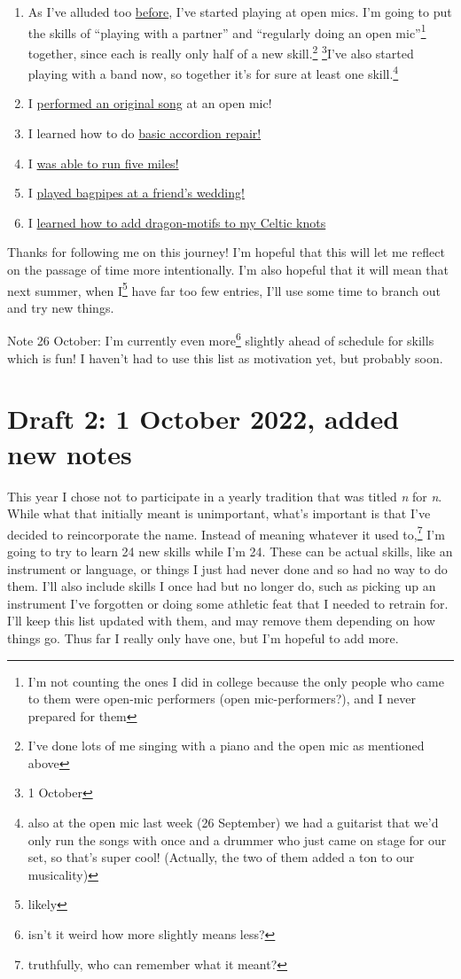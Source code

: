 \documentclass[12pt]{article}[titlepage]
\newcommand{\say}[1]{``#1''}
\newcommand{\1}{\={a}}
\newcommand{\2}{\={e}}
\newcommand{\3}{\={\i}}
\newcommand{\4}{\=o}
\newcommand{\5}{\=u}
\newcommand{\6}{\={A}}
\renewcommand{\,}{\textsuperscript{,}}
\begin{document}
\begin{enumerate}
\item As I've alluded too \href{open-mic-2.html}{before}, I've started playing at open mics.
I'm going to put the skills of \say{playing with a partner} and \say{regularly doing an open mic}\footnote{I'm not counting the ones I did in college because the only people who came to them were open-mic performers (open mic-performers?), and I never prepared for them} together, since each is really only half of a new skill.\footnote{I've done lots of me singing with a piano and the open mic as mentioned above} \footnote{1 October}I've also started playing with a band now, so together it's for sure at least one skill.\footnote{also at the open mic last week (26 September) we had a guitarist that we'd only run the songs with once and a drummer who just came on stage for our set, so that's super cool! (Actually, the two of them added a ton to our musicality)}
\item I \href{performing-a-song.html}{performed an original song} at an open mic!
\item I learned how to do \href{accordion-repair.html}{basic accordion repair!}
\item I \href{running-2.html}{was able to run five miles!} 
\item I \href{bagpipes.html}{played bagpipes at a friend's wedding!}
\item I \href{celtic-knots.html}{learned how to add dragon-motifs to my Celtic knots}
\end{enumerate}

Thanks for following me on this journey!
I'm hopeful that this will let me reflect on the passage of time more intentionally.
I'm also hopeful that it will mean that next summer, when I\footnote{likely} have far too few entries, I'll use some time to branch out and try new things.

Note 26 October: I'm currently even more\footnote{isn't it weird how more slightly means less?} slightly ahead of schedule for skills which is fun! 
I haven't had to use this list as motivation yet, but probably soon.


\section{Draft 2: 1 October 2022, added new notes}
This year I chose not to participate in a yearly tradition that was titled \textit{n} for \textit{n}.
While what that initially meant is unimportant, what's important is that I've decided to reincorporate the name.
Instead of meaning whatever it used to,\footnote{truthfully, who can remember what it meant?} I'm going to try to learn 24 new skills while I'm 24.
These can be actual skills, like an instrument or language, or things I just had never done and so had no way to do them.
I'll also include skills I once had but no longer do, such as picking up an instrument I've forgotten or doing some athletic feat that I needed to retrain for.
I'll keep this list updated with them, and may remove them depending on how things go.
Thus far I really only have one, but I'm hopeful to add more.
\end{document}
